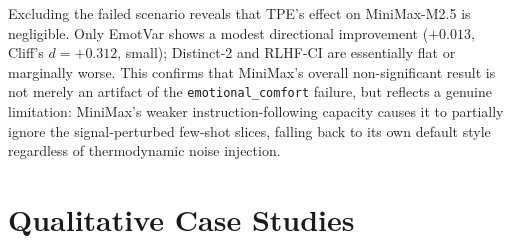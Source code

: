\noindent Excluding the failed scenario reveals that TPE's effect on MiniMax-M2.5 is negligible. Only EmotVar shows a modest directional improvement ($+0.013$, Cliff's $d = +0.312$, small); Distinct-2 and RLHF-CI are essentially flat or marginally worse. This confirms that MiniMax's overall non-significant result is not merely an artifact of the \texttt{emotional\_comfort} failure, but reflects a genuine limitation: MiniMax's weaker instruction-following capacity causes it to partially ignore the signal-perturbed few-shot slices, falling back to its own default style regardless of thermodynamic noise injection.

\section{Qualitative Case Studies}
\label{app:cases}
\setcounter{table}{0}





